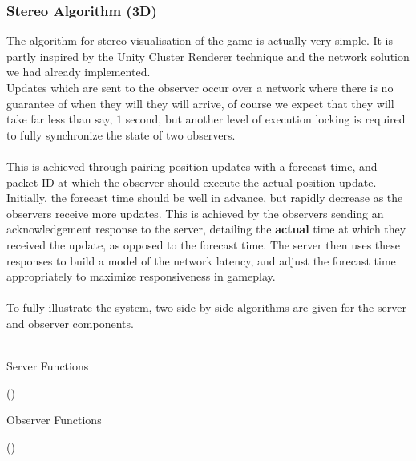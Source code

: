 \documentclass[11pt,a4paper]{article}
\begin{document}
  \subsubsection{Stereo Algorithm (3D)}

  The algorithm for stereo visualisation of the game is actually very simple. It is partly inspired by the Unity Cluster Renderer technique and the network solution we had already implemented. \\
  Updates which are sent to the observer occur over a network where there is no guarantee of when they will they will arrive, of course we expect that they will take far less than say, $1$ second, but another level of execution locking is required to fully synchronize the state of two observers. \\ \\
  This is achieved through pairing position updates with a forecast time, and packet ID at which the observer should execute the actual position update. Initially, the forecast time should be well in advance, but rapidly decrease as the observers receive more updates. This is achieved by the observers sending an acknowledgement response to the server, detailing the \textbf{actual} time at which they received the update, as opposed to the forecast time. The server then uses these responses to build a model of the network latency, and adjust the forecast time appropriately to maximize responsiveness in gameplay. \\ \\

\noindent 
  To fully illustrate the system, two side by side algorithms are given for the server and observer components. \\ \\

\begin{minipage}{8cm}
  {\Large{Server Functions}} \\
  \begin{algorithm}[H]
    \LinesNumbered
    \Fn(){}{
    }
  \end{algorithm}
\end{minipage}
\begin{minipage}{8cm}
  {\Large{Observer Functions}} \\
  \begin{algorithm}[H]
    \LinesNumbered
    \Fn(){}{
    }
  \end{algorithm}
\end{minipage}
\end{document}

